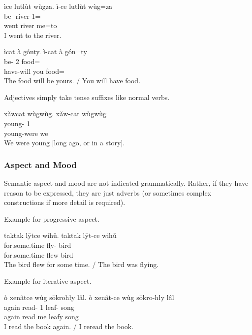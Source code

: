 \documentclass[12pt]{article}
\begin{document}
    \begin{exe}
        \ex
        \glt
        ìce lutlùt wùgza.
        \glll
        ì-ce lutlùt wùg=za \\
        be-\Pst{} river 1\Sg{}=\AllTwo{} \\
        went river me=to \\
        \glt
        I went to the river.
    \end{exe}

    \begin{exe}
        \ex
        \glt
        ìcat à gónty.
        \glll
        ì-cat à gón=ty \\
        be-\Fut{} 2\Sg{} food=\Poss{} \\
        have-will you food=\Poss{} \\
        \glt
        The food will be yours.
        /
        You will have food.
    \end{exe}

    Adjectives simply take tense suffixes like normal verbs.

    \begin{exe}
        \ex
        \glt
        xǎwcat wùgwùg.
        \glll
        xǎw-cat wùgwùg \\
        young-\Hst{} 1\Pl{} \\
        young-were we \\
        \glt
        We were young [long ago, or in a story].
    \end{exe}

    \subsubsection*{Aspect and Mood}
    Semantic aspect and mood are not indicated grammatically.
    Rather, if they have reason to be expressed, they are just adverbs
    (or sometimes complex constructions if more detail is required).

    Example for progressive aspect.
    \begin{exe}
        \ex
        \glt
        taktak lȳtce wihǔ.
        \glll
        taktak lȳt-ce wihǔ \\
        for.some.time fly-\Pst{} bird \\
        for.some.time flew bird \\
        \glt
        The bird flew for some time.
        /
        The bird was flying.
    \end{exe}

    Example for iterative aspect.
    \begin{exe}
        \ex
        \glt
        ò xenãtce wùg sōkrohły lâl.
        \glll
        ò xenãt-ce wùg sōkro-hły lâl \\
        again read-\Pst{} 1\Sg{} leaf-\Adj{} song \\
        again read me leafy song \\
        \glt
        I read the book again.
        /
        I reread the book.
    \end{exe}
\end{document}
